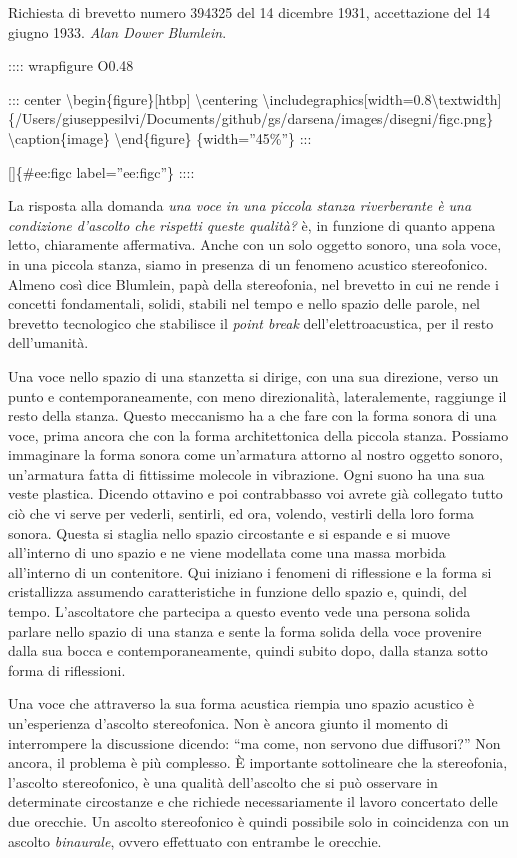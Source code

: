 \documentclass[a4paper,11pt]{article}
\begin{document}
Richiesta di brevetto numero 394325 del 14 dicembre 1931, accettazione
del 14 giugno 1933. \emph{Alan Dower Blumlein}.

:::: wrapfigure
O0.48

::: center
\textbackslash{}begin\{figure\}{[}htbp{]}
  \textbackslash{}centering
  \textbackslash{}includegraphics{[}width=0.8\textbackslash{}textwidth{]}\{/Users/giuseppesilvi/Documents/github/gs/darsena/images/disegni/figc.png\}
  \textbackslash{}caption\{image\}
\textbackslash{}end\{figure\}
\{width=''45\%''\}
:::

{[}{]}\{\#ee:figc label=''ee:figc''\}
::::

La risposta alla domanda \emph{una voce in una piccola stanza riverberante è
una condizione d'ascolto che rispetti queste qualità?} è, in funzione di
quanto appena letto, chiaramente affermativa. Anche con un solo oggetto
sonoro, una sola voce, in una piccola stanza, siamo in presenza di un
fenomeno acustico stereofonico. Almeno così dice Blumlein, papà della
stereofonia, nel brevetto in cui ne rende i concetti fondamentali,
solidi, stabili nel tempo e nello spazio delle parole, nel brevetto
tecnologico che stabilisce il \emph{point break} dell'elettroacustica, per il
resto dell'umanità.

Una voce nello spazio di una stanzetta si dirige, con una sua direzione,
verso un punto e contemporaneamente, con meno direzionalità,
lateralemente, raggiunge il resto della stanza. Questo meccanismo ha a
che fare con la forma sonora di una voce, prima ancora che con la forma
architettonica della piccola stanza. Possiamo immaginare la forma sonora
come un'armatura attorno al nostro oggetto sonoro, un'armatura fatta di
fittissime molecole in vibrazione. Ogni suono ha una sua veste plastica.
Dicendo ottavino e poi contrabbasso voi avrete già collegato tutto ciò
che vi serve per vederli, sentirli, ed ora, volendo, vestirli della loro
forma sonora. Questa si staglia nello spazio circostante e si espande e
si muove all'interno di uno spazio e ne viene modellata come una massa
morbida all'interno di un contenitore. Qui iniziano i fenomeni di
riflessione e la forma si cristallizza assumendo caratteristiche in
funzione dello spazio e, quindi, del tempo. L'ascoltatore che partecipa
a questo evento vede una persona solida parlare nello spazio di una
stanza e sente la forma solida della voce provenire dalla sua bocca e
contemporaneamente, quindi subito dopo, dalla stanza sotto forma di
riflessioni.

Una voce che attraverso la sua forma acustica riempia uno spazio
acustico è un'esperienza d'ascolto stereofonica. Non è ancora giunto il
momento di interrompere la discussione dicendo: ``ma come, non servono
due diffusori?'' Non ancora, il problema è più complesso. È importante
sottolineare che la stereofonia, l'ascolto stereofonico, è una qualità
dell'ascolto che si può osservare in determinate circostanze e che
richiede necessariamente il lavoro concertato delle due orecchie. Un
ascolto stereofonico è quindi possibile solo in coincidenza con un
ascolto \emph{binaurale}, ovvero effettuato con entrambe le orecchie.
\end{document}
